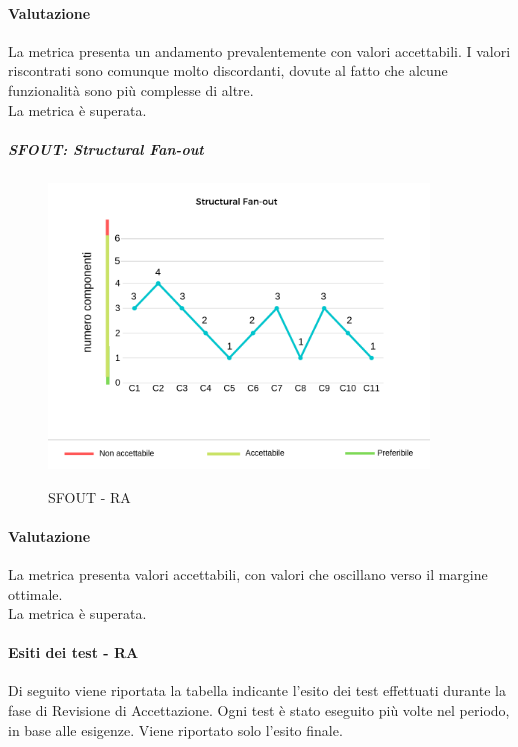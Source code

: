	\paragraph*{Valutazione} La metrica presenta un andamento prevalentemente con valori accettabili. I valori riscontrati sono comunque molto discordanti, dovute al fatto che alcune funzionalità sono più complesse di altre.
	\\ La metrica è superata.
	\pagebreak
	\subparagraph{SFOUT: Structural Fan-out}
	\begin{center}
		\begin{figure}[h] 
			\centering 
			\includegraphics[width=0.90\textwidth]{res/images/new/sfout.png}\\
			\caption{SFOUT - RA}
		\end{figure}
	\end{center}
	\paragraph*{Valutazione} La metrica presenta valori accettabili, con valori che oscillano verso il margine ottimale.
	\\ La metrica è superata.
	\pagebreak

\paragraph{Esiti dei test - RA}

Di seguito viene riportata la tabella indicante l'esito dei test effettuati durante la fase di Revisione di Accettazione. Ogni test è stato eseguito più volte nel periodo, in base alle esigenze. Viene riportato solo l'esito finale.

